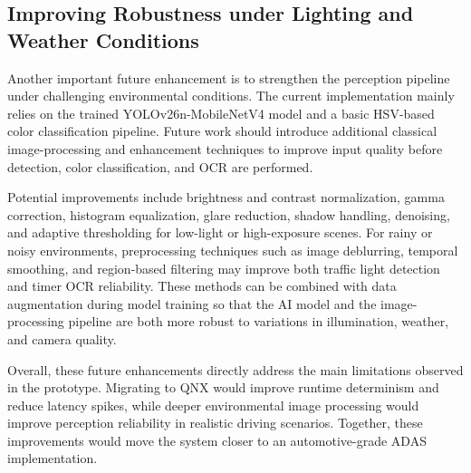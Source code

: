 \subsection{Improving Robustness under Lighting and Weather Conditions}

Another important future enhancement is to strengthen the perception pipeline under challenging environmental conditions. The current implementation mainly relies on the trained YOLOv26n-MobileNetV4 model and a basic HSV-based color classification pipeline. Future work should introduce additional classical image-processing and enhancement techniques to improve input quality before detection, color classification, and OCR are performed.

Potential improvements include brightness and contrast normalization, gamma correction, histogram equalization, glare reduction, shadow handling, denoising, and adaptive thresholding for low-light or high-exposure scenes. For rainy or noisy environments, preprocessing techniques such as image deblurring, temporal smoothing, and region-based filtering may improve both traffic light detection and timer OCR reliability. These methods can be combined with data augmentation during model training so that the AI model and the image-processing pipeline are both more robust to variations in illumination, weather, and camera quality.

Overall, these future enhancements directly address the main limitations observed in the prototype. Migrating to QNX would improve runtime determinism and reduce latency spikes, while deeper environmental image processing would improve perception reliability in realistic driving scenarios. Together, these improvements would move the system closer to an automotive-grade ADAS implementation.
